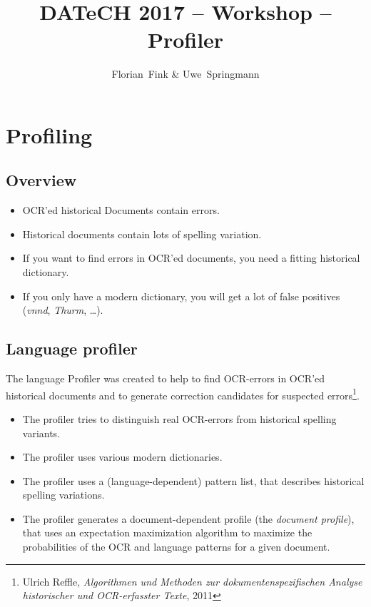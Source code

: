 
\title{DATeCH 2017 -- \pocoto{} Workshop -- Profiler}
\author{Florian~Fink \& Uwe~Springmann}



\begin{frame}
	\titlepage
\end{frame}

\section{Profiling}
\subsection{Overview}
\begin{frame}
	\begin{itemize}
		\item OCR'ed historical Documents contain errors.
		\item Historical documents contain lots of spelling variation.
		\item If you want to find errors in OCR'ed documents, you need a fitting
			historical dictionary.
		\item If you only have a modern dictionary, you will get a lot of false
			positives (\emph{vnnd}, \emph{Thurm}, \dots).
	\end{itemize}
\end{frame}

\subsection{Language profiler}
\begin{frame}
	The language Profiler was created to help to find OCR-errors in OCR'ed
	historical documents and to generate correction candidates for suspected
	errors\footnote{Ulrich Reffle, \emph{Algorithmen und Methoden zur
	dokumentenspezifischen Analyse historischer und OCR-erfasster Texte}, 2011}.

	\begin{itemize}
		\item The profiler tries to distinguish real OCR-errors from historical
			spelling variants.
		\item The profiler uses various modern dictionaries.
		\item The profiler uses a (language-dependent) pattern list, that describes
			historical spelling variations.
		\item The profiler generates a document-dependent profile (the \emph{document
			profile}), that uses an expectation maximization algorithm to maximize the
			probabilities of the OCR and language patterns for a given document.
	\end{itemize}
\end{frame}

